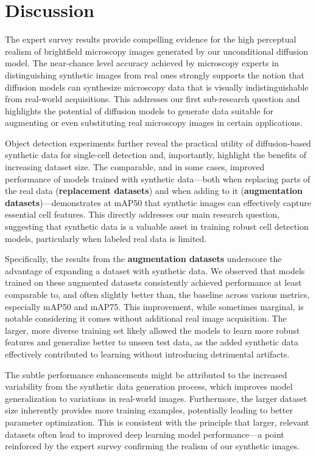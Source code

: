 \section{Discussion}
\label{sec:discussion}
The expert survey results provide compelling evidence for the high perceptual realism of brightfield microscopy images generated by our unconditional diffusion model.
The near-chance level accuracy achieved by microscopy experts in distinguishing synthetic images from real ones strongly supports the notion that diffusion models can synthesize microscopy data that is visually indistinguishable from real-world acquisitions.
This addresses our first sub-research question and highlights the potential of diffusion models to generate data suitable for augmenting or even substituting real microscopy images in certain applications.

Object detection experiments further reveal the practical utility of diffusion-based synthetic data for single-cell detection and, importantly, highlight the benefits of increasing dataset size.
The comparable, and in some cases, improved performance of models trained with synthetic data—both when replacing parts of the real data (\textbf{replacement datasets})
and when adding to it (\textbf{augmentation datasets})—demonstrates at mAP\@50 that synthetic images can effectively capture essential cell features.
This directly addresses our main research question, suggesting that synthetic data is a valuable asset in training robust cell detection models, particularly when labeled real data is limited.

Specifically, the results from the \textbf{augmentation datasets} underscore the advantage of expanding a dataset with synthetic data.
We observed that models trained on these augmented datasets consistently achieved performance at least comparable to, and often slightly better than, the baseline across various metrics, especially mAP\@50 and mAP\@75.
This improvement, while sometimes marginal, is notable considering it comes without additional real image acquisition.
The larger, more diverse training set likely allowed the models to learn more robust features and generalize better to unseen test data, as the added synthetic data effectively contributed to learning without introducing detrimental artifacts.

The subtle performance enhancements might be attributed to the increased variability from the synthetic data generation process, which improves model generalization to variations in real-world images.
Furthermore, the larger dataset size inherently provides more training examples, potentially leading to better parameter optimization.
This is consistent with the principle that larger, relevant datasets often lead to improved deep learning model performance—a point reinforced by the expert survey confirming the realism of our synthetic images.

